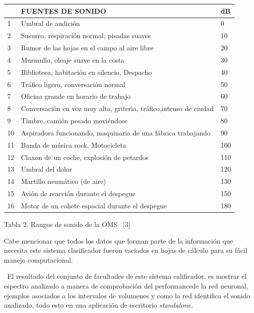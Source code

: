 \begin{center}%
\begin{tabular}
[c]{|l|l|l|}\hline
& FUENTES DE SONIDO & dB\\\hline
1 & Umbral de audici\'{o}n & 0\\\hline
2 & Susurro, respiraci\'{o}n normal, pisadas suaves & 10\\\hline
3 & Rumor de las hojas en el campo al aire libre & 20\\\hline
4 & Murmullo, oleaje suave en la costa & 30\\\hline
5 & Biblioteca, habitaci\'{o}n en silencio, Despacho & 40\\\hline
6 & Tr\'{a}fico ligero, conversaci\'{o}n normal & 50\\\hline
7 & Oficina grande en horario de trabajo & 60\\\hline
8 & Conversaci\'{o}n en voz muy alta, griter\'{\i}a, tr\'{a}fico,intenso de
ciudad & 70\\\hline
9 & Timbre, cami\'{o}n pesado movi\'{e}ndose & 80\\\hline
10 & Aspiradora funcionando, maquinaria de una f\'{a}brica trabajando &
90\\\hline
11 & Banda de m\'{u}sica rock, Motocicleta & 100\\\hline
12 & Claxon de un coche, explosi\'{o}n de petardos & 110\\\hline
13 & Umbral del dolor & 120\\\hline
14 & Martillo neum\'{a}tico (de aire) & 130\\\hline
15 & Avi\'{o}n de reacci\'{o}n durante el despegue & 150\\\hline
16 & Motor de un cohete espacial durante el despegue & 180\\\hline
\end{tabular}


Tabla 2. Rangos de sonido de la OMS \ [3]
\end{center}

Cabe mencionar que todos los datos que forman parte de la informaci\'{o}n que
necesita este sistema clasificador fueron vaciados en hojas de c\'{a}lculo
para su f\'{a}cil manejo computacional.\

\ El resultado del conjunto de facultades de este sistema calificador, es
mostrar el espectro analizado a manera de comprobaci\'{o}n del
performance\bigskip de la red neuronal, ejemplos asociados a los intervalos de
volumenes y como la red identifica el sonido analizado, todo esto en una
aplicaci\'{o}n de escritorio \textit{standalone.}

